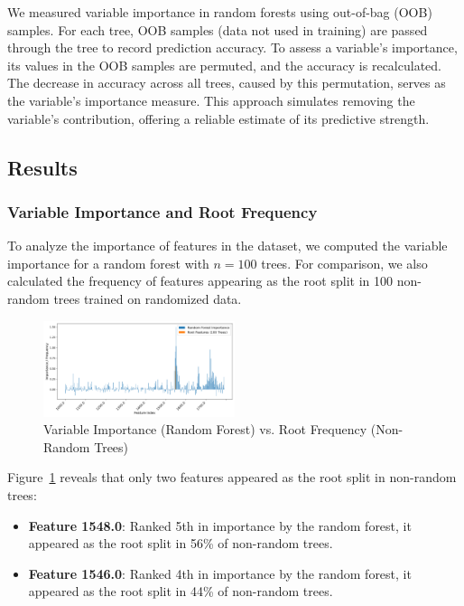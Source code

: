 \documentclass[fleqn,moreauthors,10pt]{ds_report}
\begin{document}
We measured variable importance in random forests using out-of-bag (OOB) samples. For each tree, OOB samples (data not used in training) are passed through the tree to record prediction accuracy. To assess a variable's importance, its values in the OOB samples are permuted, and the accuracy is recalculated. The decrease in accuracy across all trees, caused by this permutation, serves as the variable's importance measure. This approach simulates removing the variable's contribution, offering a reliable estimate of its predictive strength\cite{ESL}.

\subsection*{Results}


\subsubsection*{Variable Importance and Root Frequency}

To analyze the importance of features in the dataset, we computed the variable importance for a random forest with \( n = 100 \) trees. For comparison, we also calculated the frequency of features appearing as the root split in 100 non-random trees trained on randomized data.

\begin{figure}[h!]
    \centering
    \includegraphics[width=0.5\textwidth]{fig/variable_importance}
    \caption{Variable Importance (Random Forest) vs. Root Frequency (Non-Random Trees)}
    \label{fig:variable_importance}
\end{figure}

Figure~\ref{fig:variable_importance} reveals that only two features appeared as the root split in non-random trees:
\begin{itemize}
\item
 \textbf{Feature 1548.0}: Ranked 5th in importance by the random forest, it appeared as the root split in 56\% of non-random trees.
\item
\textbf{Feature 1546.0}: Ranked 4th in importance by the random forest, it appeared as the root split in 44\% of non-random trees.
\end{itemize}
\end{document}
